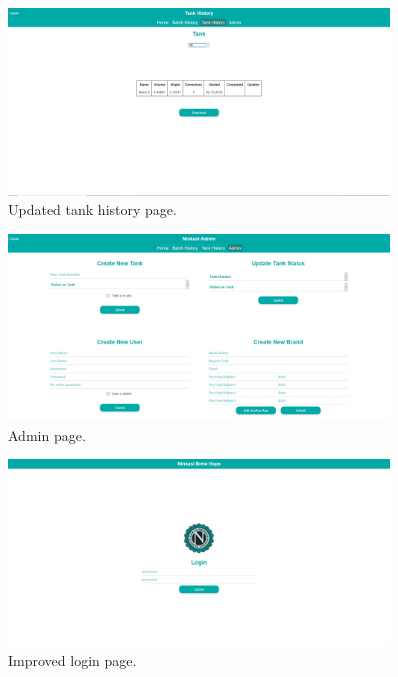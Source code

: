 \documentclass[draftclsnofoot,onecolumn,journal,letterpaper,compsoc,10pt]{IEEEtran}
\begin{document}
\begin{figure}[H]
    \centering
    \includegraphics[width=0.9\textwidth]{screenshots/progress_report_screencap-tank_history.png}
    \caption{Updated tank history page.}
\end{figure}

\begin{figure}[H]
    \centering
    \includegraphics[width=0.9\textwidth]{screenshots/progress_report_screencap-admin_page.png}
    \caption{Admin page.}
\end{figure}

\begin{figure}[H]
    \centering
    \includegraphics[width=0.9\textwidth]{screenshots/progress_report_screencap-login_page.png}
    \caption{Improved login page.}
\end{figure}


\end{document}
